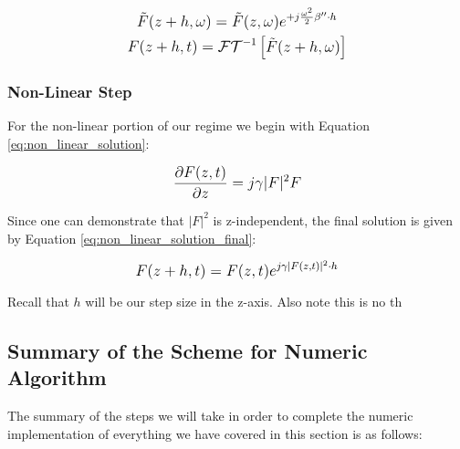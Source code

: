 \documentclass[colorlinks,11pt,a4paper,normalphoto,withhyper,ragged2e]{altareport}
\begin{document}
			\begin{gather} \label{eq:dispersive_solution_freq} 
				\mathlarger{\tilde{F}(z+h, \omega) =  \tilde{F}(z, \omega) e^{+ j \frac{\omega^2}{2} \beta '' \cdot h} }\\
				\mathlarger{F(z+h, t) = \mathcal{FT}^{-1} \begin{bmatrix} \tilde{F}(z+h, \omega) \end{bmatrix}} \label{eq:dispersive_solution_time}
			\end{gather}
			
			\vspace{5mm}
		
		
		\subsubsection{Non-Linear Step}
			For the non-linear portion of our regime we begin with Equation \ref{eq:non_linear_solution}:
			
			\begin{equation} \label{eq:non_linear_solution}
				\mathlarger{\frac{\partial F(z, t)}{\partial z} = j \gamma |F|^2 F}
			\end{equation}
			
			\vspace{5mm}
			
			Since one can demonstrate that $|F|^2$ is z-independent, the final solution is given by Equation \ref{eq:non_linear_solution_final}:

			\begin{equation} \label{eq:non_linear_solution_final}
				\mathlarger{ F(z+h, t) =  F(z, t) e^{j \gamma |F(z, t)|^2 \cdot h}}
			\end{equation}
			
			{\footnotesize Recall that $h$ will be our step size in the z-axis. Also note this is no th}
			
			
			\pagebreak
			
			
	\subsection{Summary of the Scheme for Numeric Algorithm}
		The summary of the steps we will take in order to complete the numeric implementation of everything we have covered in this section is as follows: \linebreak
		
\end{document}
